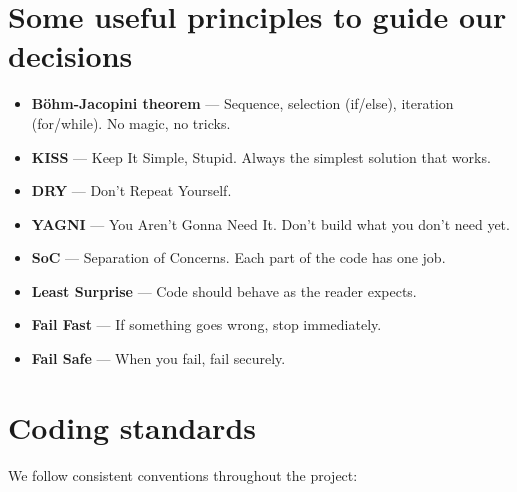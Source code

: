\documentclass[11pt,a4paper,oneside]{book}
\providecommand{\tightlist}{%
  \setlength{\itemsep}{0pt}\setlength{\parskip}{0pt}}
\begin{document}
\hypertarget{some-useful-principles-to-guide-our-decisions}{%
\section{Some useful principles to guide our
decisions}\label{some-useful-principles-to-guide-our-decisions}}

\begin{itemize}
\tightlist
\item
  \textbf{Böhm-Jacopini theorem} --- Sequence, selection
  (if/else), iteration (for/while). No magic, no tricks.
\item
  \textbf{KISS} --- Keep It Simple, Stupid. Always the simplest
  solution that works.
\item
  \textbf{DRY} --- Don't Repeat Yourself.
\item
  \textbf{YAGNI} --- You Aren't Gonna Need It. Don't build what
  you don't need yet.
\item
  \textbf{SoC} --- Separation of Concerns. Each part of the code
  has one job.
\item
  \textbf{Least Surprise} --- Code should behave as the reader
  expects.
\item
  \textbf{Fail Fast} --- If something goes wrong, stop
  immediately.
\item
  \textbf{Fail Safe} --- When you fail, fail securely.
\end{itemize}

\hypertarget{coding-standards}{%
\section{Coding standards}\label{coding-standards}}

We follow consistent conventions throughout the project:
\end{document}
